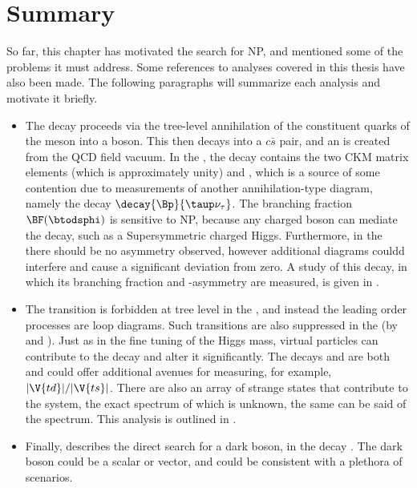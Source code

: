 \section{Summary}

So far, this chapter has motivated the search for NP, and mentioned some of the problems it must
address.
Some references to analyses covered in this thesis have also been made.
The following paragraphs will summarize each analysis and motivate it briefly.

    \begin{itemize}
      \item
        The decay \btodsphi proceeds via the tree-level annihilation of the constituent quarks of
        the \Bp meson into a \Wp boson.
        This then decays into a $c\bar s$ pair, and an \ssbar is created from the QCD field vacuum.
        In the \sm, the decay contains the two CKM matrix elements  (which is approximately
        unity) and
        , which is a source of some contention due to measurements of another
        annihilation-type diagram, namely the decay $\decay{\Bp}{\taup\nu_\tau}$.
        The branching fraction $\BF(\btodsphi)$ is sensitive to NP, because any charged boson can
        mediate
        the decay, such as a Supersymmetric charged Higgs.
        Furthermore, in the \sm there should be no \CP asymmetry observed, however additional
        diagrams couldd
        interfere and cause a significant deviation from zero.
        A study of this decay, in which its branching fraction and \CP-asymmetry are measured, is
        given in
        .
      \item
        The \fcnc transition  is forbidden at tree level in the \sm, and instead
        the leading order processes are loop diagrams.
        Such transitions are also \ckm suppressed in the \sm (by  and ).
        Just as in the fine tuning of the Higgs mass, virtual \bsm particles can contribute to the
        decay and
        alter it significantly.
        The decays \btokpipimumu and \btophikmumu are both   and could offer
        additional avenues for measuring, for example, $|\V{td}|/|\V{ts}|$.
        There are also an array of strange states that contribute to the \kpipi system, the exact
        spectrum of which is unknown, the same can be said of the \phik spectrum.
        This analysis is outlined in .
      \item
        Finally,  describes the direct search for a dark boson, \decay{\db}{\mumu} in
        the decay \decay{\Bd}{\Kstarent\mumu}.
        The dark boson could be a scalar or vector, and could be consistent with a plethora of \bsm
        scenarios.
    \end{itemize}








